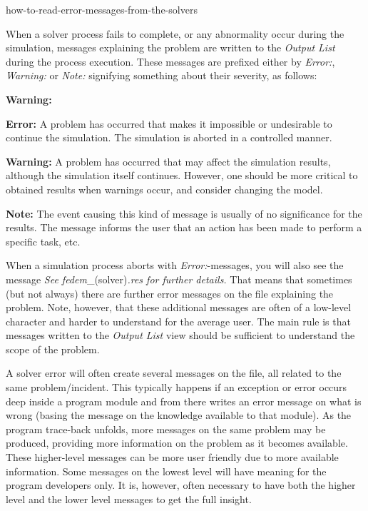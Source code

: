            {how-to-read-error-messages-from-the-solvers}

When a solver process fails to complete, or any abnormality occur during the
simulation, messages explaining the problem are written to the {\sl Output List}
during the process execution.
These messages are prefixed either by {\sl Error:}, {\sl Warning:}
or {\sl Note:} signifying something about their severity, as follows:

\begin{namelist}{\textbf{Warning:}}
\item[\textbf{Error:}]
  A problem has occurred that makes it impossible or undesirable to continue
  the simulation. The simulation is aborted in a controlled manner.

\item[\textbf{Warning:}]
  A problem has occurred that may affect the simulation results,
  although the simulation itself continues. However, one should be more critical
  to obtained results when warnings occur, and consider changing the model.

\item[\textbf{Note:}]
  The event causing this kind of message is usually of no significance for the
  results. The message informs the user that an action has been made to perform
  a specific task, etc.
\end{namelist}

When a simulation process aborts with {\sl Error:}-messages, you will also see
the message {\sl See fedem}\_(solver){\sl .res for further details.}
That means that sometimes (but not always) there are further error messages
on the  file explaining the problem.
Note, however, that these additional messages are often of a low-level
character and harder to understand for the average user.
The main rule is that messages written to the {\sl Output List} view should be
sufficient to understand the scope of the problem.


A solver error will often create several messages on the  file,
all related to the same problem/incident. This typically happens if an exception
or error occurs deep inside a program module and from there writes an error
message on what is wrong (basing the message on the knowledge available to that
module). As the program trace-back unfolds, more messages on the same problem
may be produced, providing more information on the problem as it becomes
available. These higher-level messages can be more user friendly due to more
available information. Some messages on the lowest level will have meaning for
the program developers only. It is, however, often necessary to have both the
higher level and the lower level messages to get the full insight.

